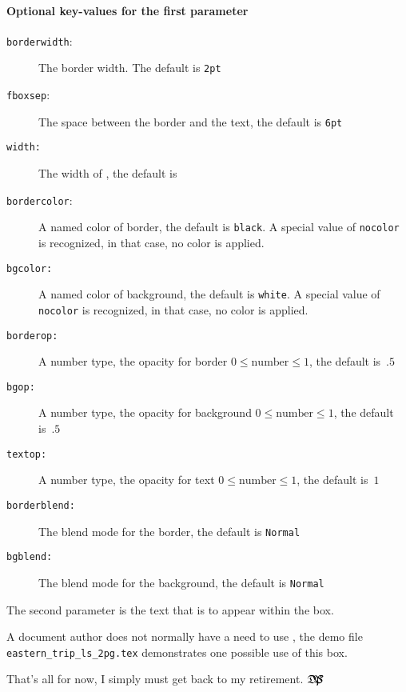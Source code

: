 \documentclass{article}
\def\dps{$\hbox{$\mathfrak D$\kern-.3em\hbox{$\mathfrak P$}%
   \kern-.6em \hbox{$\mathcal S$}}$}
\begin{document}
\paragraph*{Optional key-values for the first parameter}
\begin{description}
   \item[\texttt{borderwidth}:] The border width. The default is \texttt{2pt}
   \item[\texttt{fboxsep}:] The space between the border and the text, the default is \texttt{6pt}
   \item[\texttt{width:}] The width of , the default is 
   \item[\texttt{bordercolor}:] A named color of border, the default is \texttt{black}. A special value
   of \texttt{nocolor} is recognized, in that case, no color is applied.
   \item[\texttt{bgcolor:}] A named color of background, the default is \texttt{white}. A special value
   of \texttt{nocolor} is recognized, in that case, no color is applied.
   \item[\texttt{borderop:}] A number type, the opacity for border $0 \le \mbox{number} \le 1$, the default is~$.5$
   \item[\texttt{bgop:}] A number type, the opacity for background $0 \le \mbox{number} \le 1$, the default is~$.5$
   \item[\texttt{textop:}] A number type, the opacity for text $0 \le \mbox{number} \le 1$, the default is~$1$
   \item[\texttt{borderblend:}] The blend mode for the border, the default is \texttt{Normal}
   \item[\texttt{bgblend:}] The blend mode for the background, the default is \texttt{Normal}
\end{description}
The second parameter  is the text that is to appear within the
box.\medskip

A document author does not normally have a need to use , the
demo file \texttt{eastern\_trip\_ls\_2pg.tex} demonstrates one possible use
of this box.


\newtopic\noindent
That's all for now, I simply must get back to my retirement. \dps
\end{document}
